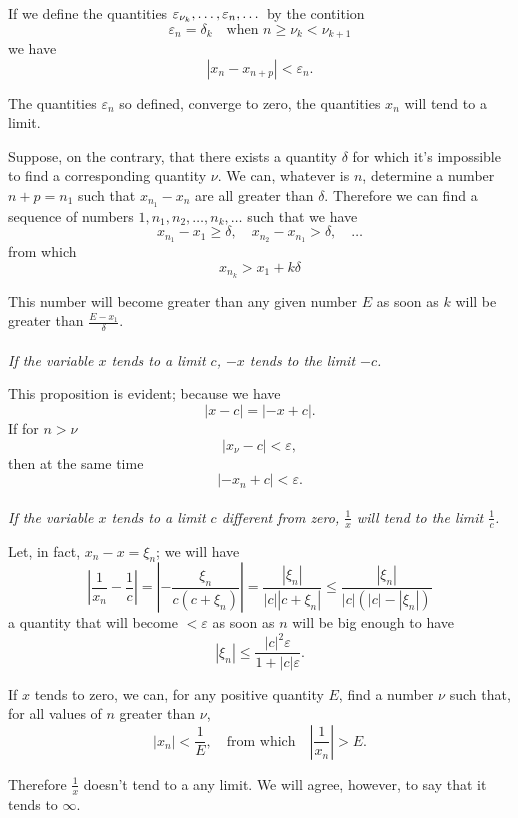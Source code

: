 \documentclass[10pt,letterpaper]{book}
\renewcommand\epsilon{\varepsilon}
\theoremstyle{definition}
\begin{document}
If we define the quantities $\jseq{\epsilon_{\nu_k}}{\epsilon_n}$ by the contition
\[
  \epsilon_n = \delta_k\quad\mbox{when }n\geq\nu_k<\nu_{k+1}
\]
we have
\[
  |x_{n}-x_{n+p}| < \epsilon_n.
\]

The quantities $\epsilon_n$ so defined, converge to zero, the quantities $x_n$ will tend to a limit.

Suppose, on the contrary, that there exists a quantity $\delta$ for which it's impossible to find a corresponding quantity $\nu$. We can, whatever is $n$, determine a number $n+p=n_1$ such that $x_{n_1}-x_n$ are all greater than $\delta$.
Therefore we can find a sequence of numbers $1, n_1, n_2,\dots,n_k,\dots$ such that we have
\[
  x_{n_1}-x_1\geq \delta,\quad x_{n_2}-x_{n_1}>\delta,\quad\dots
\]
from which
\[
  x_{n_k}>x_1+k\delta
\]

This number will become greater than any given number $E$ as soon as $k$ will be greater than $\frac{E-x_1}{\delta}$.

\paragraph{} \textit{If the variable $x$ tends to a limit $c$, $-x$ tends to the limit $-c$.}


This proposition is evident; because we have
\[
  |x-c|=|-x+c|.
\]
If for $n>\nu$
\[
  |x_\nu-c|<\epsilon,
\]
then at the same time
\[
  |-x_n+c|<\epsilon.
\]

\paragraph{} \textit{If the variable $x$ tends to a limit $c$ different from zero, $\frac 1 x$ will tend to the limit $\frac 1 c$.}

Let, in fact, $x_n-x=\xi_n$; we will have
\[
  \left|\frac{1}{x_n} - \frac 1 c\right| = 
    \left|-\frac{\xi_n}{c(c+\xi_n)}\right| =
    \frac{|\xi_n|}{|c||c+\xi_n|} \leq
    \frac{|\xi_n|}{|c|(|c|-|\xi_n|)}
\]
a quantity that will become $<\epsilon$ as soon as $n$ will be big enough to have
\[
  |\xi_n|\leq\frac{|c|^2\epsilon}{1+|c|\epsilon}.
\]

If $x$ tends to zero, we can, for any positive quantity $E$, find a number $\nu$ such that, for all values of $n$ greater than $\nu$,
\[
  |x_n|<\frac 1 E,
    \quad\mbox{from which}\quad
    \left|\frac 1 {x_n}\right|> E.
\]

Therefore $\frac 1 x$ doesn't tend to a any limit. We will agree, however, to say that it tends to $\infty$.
\end{document}
